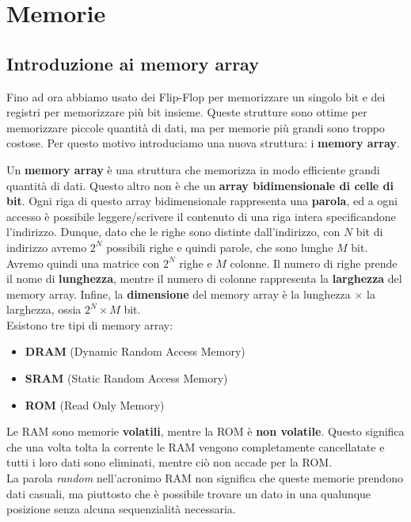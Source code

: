\documentclass[11pt, a4paper, titlepage, oneside]{scrbook}
\begin{document}
\chapter{Memorie}

\section{Introduzione ai memory array}

Fino ad ora abbiamo usato dei Flip-Flop per memorizzare un singolo bit e dei registri per memorizzare più bit insieme. Queste strutture sono ottime per memorizzare piccole quantità di dati, ma per memorie più grandi sono troppo costose. Per questo motivo introduciamo una nuova struttura: i \textbf{memory array}.

\begin{Definizione}
\label{def-memory-array}
Un \textbf{memory array} è una struttura che memorizza in modo efficiente grandi quantità di dati. Questo altro non è che un \textbf{array bidimensionale di celle di bit}. Ogni riga di questo array bidimensionale rappresenta una \textbf{parola}, ed a ogni accesso è possibile leggere/scrivere il contenuto di una riga intera specificandone l'indirizzo. Dunque, dato che le righe sono distinte dall'indirizzo, con $N$ bit di indirizzo avremo $2^N$ possibili righe e quindi parole, che sono lunghe $M$ bit. Avremo quindi una matrice con $2^N$ righe e $M$ colonne. Il numero di righe prende il nome di \textbf{lunghezza}, mentre il numero di colonne rappresenta la \textbf{larghezza} del memory array. Infine, la \textbf{dimensione} del memory array è la lunghezza $\times$ la larghezza, ossia $2^N \times M$ bit.\\
Esistono tre tipi di memory array:
\begin{itemize}
    \item \textbf{DRAM} (Dynamic Random Access Memory)
    \item \textbf{SRAM} (Static Random Access Memory)
    \item \textbf{ROM} (Read Only Memory)
\end{itemize}
Le RAM sono memorie \textbf{volatili}, mentre la ROM è \textbf{non volatile}. Questo significa che una volta tolta la corrente le RAM vengono completamente cancellatate e tutti i loro dati sono eliminati, mentre ciò non accade per la ROM.\\
\NB La parola \textit{random} nell'acronimo RAM non significa che queste memorie prendono dati casuali, ma piuttosto che è possibile trovare un dato in una qualunque posizione senza alcuna sequenzialità necessaria. 
\end{Definizione}
\end{document}
